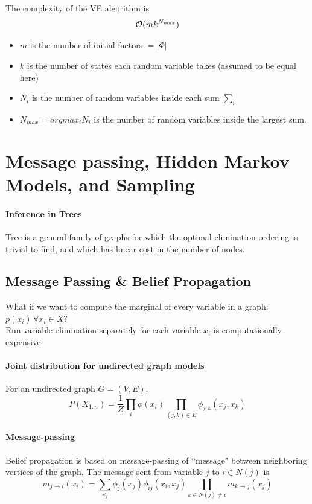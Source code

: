 \documentclass[11pt]{article}
\begin{document}
The complexity of the VE algorithm is
$$\mathcal{O}(mk^{N_{max}})$$
\begin{itemize}
	\item $m$ is the number of initial factors $ = |\Phi|$
	\item $k$ is the number of states each random variable takes (assumed to be equal here)
	\item $N_i$ is the number of random variables inside each sum $\sum_i$
	\item $N_{max} = argmax_i N_i$ is the number of random variables inside the largest sum. 
\end{itemize}

\section{Message passing, Hidden Markov Models, and Sampling}
\paragraph{Inference in Trees}
Tree is a general family of graphs for which the optimal elimination ordering is trivial to find, and which has linear cost in the number of nodes.
\subsection{Message Passing \& Belief Propagation}
What if we want to compute the marginal of every variable in a graph: $p(x_i) \, \forall x_i \in X$? \\
Run variable elimination separately for each variable $x_i$ is computationally expensive. \\
\paragraph{Joint distribution for undirected graph models}
For an undirected graph $G = (V, E)$,
$$P(X_{1:n}) = \frac{1}{Z} \prod_i \phi(x_i) \prod_{(j, k) \in E} \phi_{j, k}(x_j, x_k)$$
\paragraph{Message-passing}
Belief propagation is based on message-passing of ``message" between neighboring vertices of the graph. The message sent from variable $j$ to $i \in N(j)$ is
$$m_{j \rightarrow i}(x_i) = \sum_{x_j} \phi_j(x_j)\phi_{ij}(x_i, x_j) \prod_{k \in N(j) \neq i} m_{k \rightarrow j}(x_j)$$
\end{document}
